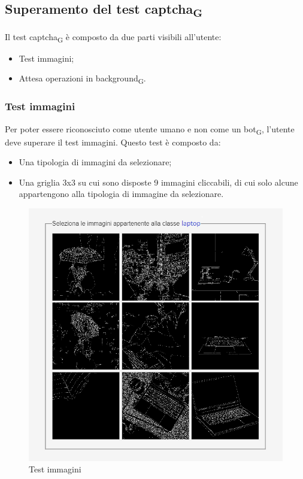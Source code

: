 \subsection{Superamento del test captcha\textsubscript{G}}
Il test captcha\textsubscript{G} è composto da due parti visibili all'utente:
\begin{itemize}
	\item Test immagini;
	\item Attesa operazioni in background\textsubscript{G}.
\end{itemize} 

\subsubsection{Test immagini}
Per poter essere riconosciuto come utente umano e non come un bot\textsubscript{G}, l'utente deve superare il test immagini. Questo test è composto da:
\begin{itemize}
    \item Una tipologia di immagini da selezionare;
	\item Una griglia 3x3 su cui sono disposte 9 immagini cliccabili, di cui solo alcune appartengono alla tipologia di immagine da selezionare.
\end{itemize} 

\begin{figure}[H]
    \centering
    \includegraphics[scale=0.6]{img/captchaimg.png}
    \caption{Test immagini}
\end{figure}


